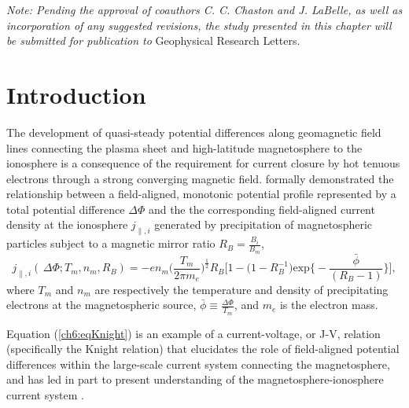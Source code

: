 \textit{Note: Pending the approval of coauthors C. C. Chaston and J. LaBelle, as
  well as incorporation of any suggested revisions, the study presented in this
  chapter will be submitted for publication to} Geophysical Research Letters.

  \section{Introduction}

  The development of quasi-steady potential differences along geomagnetic field
  lines connecting the plasma sheet and high-latitude magnetosphere to the
  ionosphere is a consequence of the requirement for current closure by hot
  tenuous electrons through a strong converging magnetic
  field. \citet{Knight1973} formally demonstrated the relationship between a
  field-aligned, monotonic potential profile represented by a total potential
  difference $\Delta \Phi$ and the the corresponding field-aligned current
  density at the ionosphere $j_{\parallel,i}$ generated by precipitation of
  magnetospheric particles subject to a magnetic mirror ratio
  $R_B = \frac{B_{i}}{B_{m}}$,
  \begin{equation} \label{ch6:eqKnight} j_{\parallel,i} ( \, \Delta \Phi ; T_m,
    n_m, R_B ) = - e n_m \Big ( \dfrac{T_m}{2 \pi m_e} \Big )^{\frac{1}{2}}
    R_B \Bigg [ 1 - \Big ( 1 - R_B^{-1} \Big ) \textrm{exp} \Big \{ - \dfrac{\bar{\phi}}{( R_B - 1 )} \Big \} \Bigg],
  \end{equation}
  where $T_m$ and $n_m$ are respectively the temperature and density of
  precipitating electrons at the magnetospheric source,
  $\bar{\phi} \equiv \frac{\Delta \Phi}{T_m}$, and $m_e$ is the electron mass.


  Equation (\ref{ch6:eqKnight}) is an example of a current-voltage, or J-V,
  relation (specifically the Knight relation) that elucidates the role of
  field-aligned potential differences within the large-scale current system
  connecting the magnetosphere, and has led in part to present understanding of
  the magnetosphere-ionosphere current system
  \citep[e.g.,][]{Temerin1997,Hultqvist1999,Cowley2000,Bostrom2003a,Paschmann2003,Pierrard2007a,Karlsson2012}.

